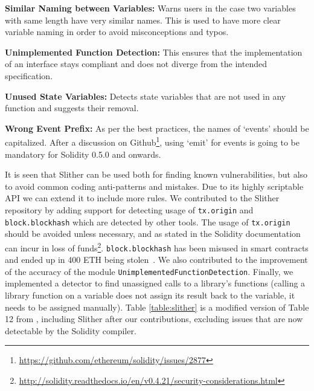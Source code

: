 \textbf{Similar Naming between Variables:} Warns users in the case two variables with same length have very similar names. This is used to have more clear variable naming in order to avoid misconceptions and typos.

\textbf{Unimplemented Function Detection:} This ensures that the implementation of an interface stays compliant and does not diverge from the intended specification.

\textbf{Unused State Variables:} Detects state variables that are not used in any function and suggests their removal.

\textbf{Wrong Event Prefix:} As per the best practices, the names of `events' should be capitalized. After a discussion on Github\footnote{\url{https://github.com/ethereum/solidity/issues/2877}}, using `emit' for events is going to be mandatory for Solidity 0.5.0 and onwards.

It is seen that Slither can be used both for finding known vulnerabilities, but also to avoid common coding anti-patterns and mistakes. Due to its highly scriptable API we can extend it to include more rules. We contributed to the Slither repository by adding support for detecting usage of \texttt{tx.origin} and \texttt{block.blockhash} which are detected by other tools. The usage of \texttt{tx.origin} should be avoided unless necessary, and as stated in the Solidity documentation can incur in loss of funds\footnote{\url{http://solidity.readthedocs.io/en/v0.4.21/security-considerations.html}}. \texttt{block.blockhash} has been misused in smart contracts and ended up in 400 ETH being stolen~\cite{smartbillions}. We also contributed to the improvement of the accuracy of the module \texttt{UnimplementedFunctionDetection}. Finally, we implemented a detector to find unassigned calls to a library's functions (calling a library function on a variable does not assign its result back to the variable, it needs to be assigned manually). Table \ref{table:slither} is a modified version of Table 12 from \cite{tools}, including Slither after our contributions, excluding issues that are now detectable by the Solidity compiler. %





